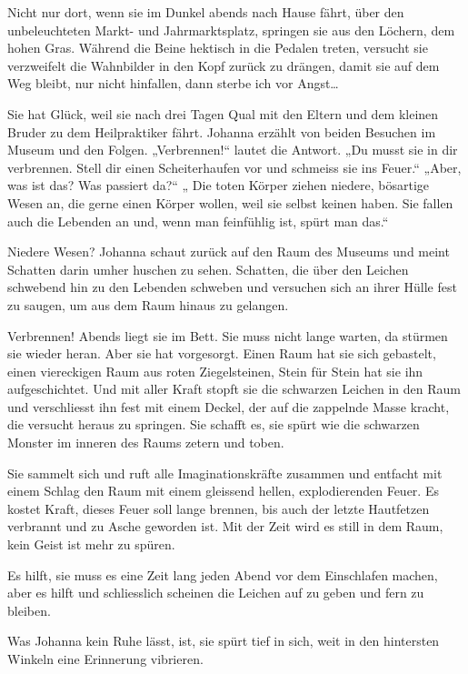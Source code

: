 \documentclass[10pt,titlepage,a5paper]{book}
\begin{document}
Nicht nur dort, wenn sie im Dunkel abends nach Hause fährt, über den unbeleuchteten Markt- und Jahrmarktsplatz, springen sie aus den Löchern, dem hohen Gras. Während die Beine hektisch in die Pedalen treten, versucht sie verzweifelt die Wahnbilder in den Kopf zurück zu drängen, damit sie auf dem Weg bleibt, nur nicht hinfallen, dann sterbe ich vor Angst\dots 

Sie hat Glück, weil sie nach drei Tagen Qual mit den Eltern und dem kleinen Bruder zu dem Heilpraktiker fährt. Johanna erzählt von beiden Besuchen im Museum und den Folgen. „Verbrennen!“ lautet die Antwort. „Du musst sie in dir verbrennen. Stell dir einen Scheiterhaufen vor und schmeiss sie ins Feuer.“ „Aber, was ist das? Was passiert da?“  „ Die toten Körper ziehen niedere, bösartige Wesen an, die gerne einen Körper wollen, weil sie selbst keinen haben. Sie fallen auch die Lebenden an und, wenn man feinfühlig ist, spürt man das.“

Niedere Wesen? Johanna schaut zurück auf den Raum des Museums und meint Schatten darin umher huschen zu sehen. Schatten, die über den Leichen schwebend hin zu den Lebenden schweben und versuchen sich an ihrer Hülle fest zu saugen, um aus dem Raum hinaus zu gelangen. 

Verbrennen! Abends liegt sie im Bett. Sie muss nicht lange warten, da stürmen sie wieder heran. Aber sie hat vorgesorgt. Einen Raum hat sie sich gebastelt, einen viereckigen Raum aus roten Ziegelsteinen, Stein für Stein hat sie ihn aufgeschichtet. Und mit aller Kraft stopft sie die schwarzen Leichen in den Raum und verschliesst ihn fest mit einem Deckel, der auf die zappelnde Masse kracht, die versucht heraus zu springen. Sie schafft es, sie spürt wie die schwarzen Monster im inneren des Raums zetern und toben. 

Sie sammelt sich und ruft alle Imaginationskräfte zusammen und entfacht mit einem Schlag den Raum mit einem gleissend hellen, explodierenden Feuer. Es kostet Kraft, dieses Feuer soll lange brennen, bis auch der letzte Hautfetzen verbrannt und zu Asche geworden ist. Mit der Zeit wird es still in dem Raum, kein Geist ist mehr zu spüren.

Es hilft, sie muss es eine Zeit lang jeden Abend vor dem Einschlafen machen, aber es hilft und schliesslich scheinen die Leichen auf zu geben und fern zu bleiben.

Was Johanna kein Ruhe lässt, ist, sie spürt tief in sich, weit in den hintersten Winkeln eine Erinnerung vibrieren. 
\end{document}
